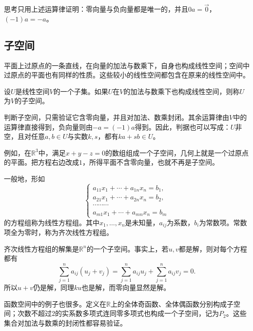 {\kaiti{}思考\quad 只用上述运算律证明：零向量与负向量都是唯一的，并且\(0 a = \vec{0}\)，\(\left( - 1 \right) a = - a\)。}

\subsection{子空间}
平面上过原点的一条直线，在向量的加法与数乘下，自身也构成线性空间；空间中过原点的平面也有同样的性质。这些较小的线性空间都包含在原来的线性空间中。

\begin{definition}\label{def:subspace}
设\(U\)是线性空间\(V\)的一个子集。如果\(U\)在\(V\)的加法与数乘下也构成线性空间，则称\(U\)为\(V\)的子空间。
\end{definition}

判断子空间，只需验证它含零向量，并且对加法、数乘封闭。其余运算律由\(V\)中的运算律直接得到，负向量则由\(- a = \left( - 1 \right) a\)得到。因此，判据也可以写成：\(U\)非空，且对任意\(a , b \in U\)与实数\(k , s\)，都有\(k a + s b \in U\)。

例如，在\(\mathbb{R}^{3}\)中，满足\(x + y - z = 0\)的数组组成一个子空间，几何上就是一个过原点的平面。把方程右边改成\(1\)，所得平面不含零向量，也就不再是子空间。

一般地，形如
\begin{equation}
    \left\{ \begin{matrix}
        a_{11} x_{1} + \cdots + a_{1 n} x_{n} = b_{1} , \\
        a_{21} x_{1} + \cdots + a_{2 n} x_{n} = b_{2} , \\
        \cdots \cdots \cdots \\
        a_{m 1} x_{1} + \cdots + a_{m n} x_{n} = b_{m}
    \end{matrix} \right.
\end{equation}
的方程组称为{\heiti{}线性方程组}。其中\(x_{1} , \ldots , x_{n}\)是未知量，\(a_{i j}\)为系数，\(b_{i}\)为常数项。常数项全为零时，称为{\heiti{}齐次线性方程组}。

齐次线性方程组的解集是\(\mathbb{R}^{n}\)的一个子空间。事实上，若\(u , v\)都是解，则对每个方程都有
\begin{equation}
    \sum_{j = 1}^{n} a_{i j} \left( u_{j} + v_{j} \right)
    = \sum_{j = 1}^{n} a_{i j} u_{j} + \sum_{j = 1}^{n} a_{i j} v_{j} = 0 .
\end{equation}
所以\(u + v\)仍是解，同理\(k u\)也是解，而零向量显然是解。

函数空间中的例子也很多。定义在\(\mathbb{R}\)上的全体奇函数、全体偶函数分别构成子空间；次数不超过\(2\)的实系数多项式连同零多项式也构成一个子空间，记为\(P_{2}\)。这些集合对加法与数乘的封闭性都容易验证。

